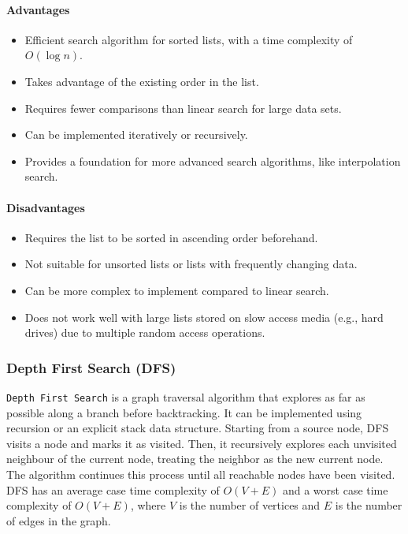 \paragraph{Advantages}
\begin{itemize}
    \item Efficient search algorithm for sorted lists, with a time complexity of $O(\log n)$.
    \item Takes advantage of the existing order in the list.
    \item Requires fewer comparisons than linear search for large data sets.
    \item Can be implemented iteratively or recursively.
    \item Provides a foundation for more advanced search algorithms, like interpolation search.
\end{itemize}
\paragraph{Disadvantages}
\begin{itemize}
    \item Requires the list to be sorted in ascending order beforehand.
    \item Not suitable for unsorted lists or lists with frequently changing data.
    \item Can be more complex to implement compared to linear search.
    \item Does not work well with large lists stored on slow access media (e.g., hard drives) due to multiple random access operations.
\end{itemize}

\subsubsection{Depth First Search (DFS)}
\lstinline{Depth First Search} is a graph traversal algorithm that explores as far as possible along a branch before backtracking. It can be implemented using recursion or an explicit stack data structure. Starting from a source node, DFS visits a node and marks it as visited. Then, it recursively explores each unvisited neighbour of the current node, treating the neighbor as the new current node. The algorithm continues this process until all reachable nodes have been visited. DFS has an average case time complexity of $O(V + E)$ and a worst case time complexity of $O(V + E)$, where $V$ is the number of vertices and $E$ is the number of edges in the graph.

